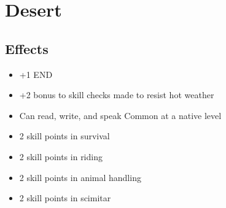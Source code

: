 \section{Desert}\label{culture:desert}

\subsection*{Effects}
\begin{itemize}
    \item +1 END
    \item +2 bonus to skill checks made to resist hot weather
    \item Can read, write, and speak Common at a native level
    \item 2 skill points in survival
    \item 2 skill points in riding
    \item 2 skill points in animal handling
    \item 2 skill points in scimitar
\end{itemize}
